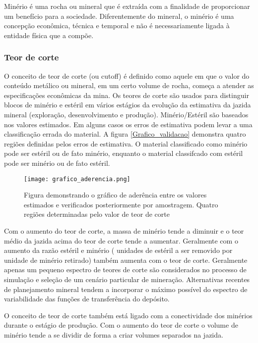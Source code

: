\begin{remark}
	Minério é uma rocha ou mineral que é extraída com a finalidade de proporcionar um benefício para a sociedade. Diferentemente do mineral, o minério é uma concepção econômica, técnica e temporal e não é necessariamente ligada à entidade física que a compõe.
\end{remark}

\subsubsection{Teor de corte}

O conceito de teor de corte (ou cutoff) é definido como aquele em que o valor do conteúdo metálico ou mineral, em um certo volume de rocha, começa a atender as especificações econômicas da mina. Os teores de corte são usados para distinguir blocos de minério e estéril em vários estágios da evolução da estimativa da jazida mineral (exploração, desenvolvimento e produção). Minério/Estéril são baseados nos valores estimados. Em alguns casos os erros de estimativa podem levar a uma classificação errada do material. A figura \eqref{Grafico_validacao} demonstra quatro regiões definidas pelos erros de estimativa. O material classificado como minério pode ser estéril ou de fato minério, enquanto o material classifcado com estéril pode ser minério ou  de fato estéril.   

\begin{figure}[H]
	\centering
	\texttt{[image: grafico\_aderencia.png]}	
	\caption{Figura demonstrando o gráfico de aderência entre os valores estimados e verificados posteriormente por amostragem. Quatro regiões determinadas pelo valor de teor de corte }
	\label{Grafico_validacao}
\end{figure}

Com o aumento do teor de corte, a massa de minério tende a diminuir e o teor médio da jazida acima do teor de corte tende a aumentar. Geralmente com o aumento da razão estéril e minério ( unidades de estéril a ser removido por unidade de minério retirado) também aumenta com o teor de corte. Geralmente apenas um pequeno espectro de teores de corte são considerados no processo de simulação e seleção de um cenário particular de mineração. Alternativas recentes de planejamento mineral tendem a incorporar o máximo possível do espectro de variabilidade das funções de transferência do depósito. 

O conceito de teor de corte também está ligado com a conectividade dos minérios durante o estágio de produção. Com o aumento do teor de corte o volume de minério tende a se dividir de forma a criar volumes separados na jazida. 

